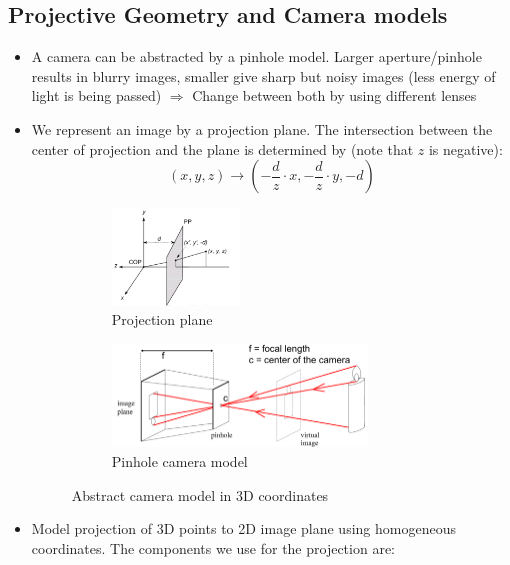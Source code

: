 \subsection{Projective Geometry and Camera models}
\begin{itemize}
	\item A camera can be abstracted by a pinhole model. Larger aperture/pinhole results in blurry images, smaller give sharp but noisy images (less energy of light is being passed) $\Rightarrow$ Change between both by using different lenses
	\item We represent an image by a projection plane. The intersection between the center of projection and the plane is determined by (note that $z$ is negative):
	$$(x,y,z)\to (-\frac{d}{z}\cdot x, -\frac{d}{z}\cdot y, -d)$$ 
	\begin{figure}[ht!]
		\centering
		\begin{subfigure}[b]{0.48\textwidth}
			\centering
			\includegraphics[width=0.4\textwidth]{figures/cv_image_formation_3D_model.png}
			\caption{Projection plane}
		\end{subfigure}
		\begin{subfigure}[b]{0.48\textwidth}
			\includegraphics[width=0.8\textwidth]{figures/cv_image_formation_3D_model_2.png}
			\caption{Pinhole camera model}
		\end{subfigure}
		\caption{Abstract camera model in 3D coordinates}
	\end{figure}
	\item Model projection of 3D points to 2D image plane using homogeneous coordinates. The components we use for the projection are:
	\begin{itemize}

\end{itemize}
\end{itemize}
